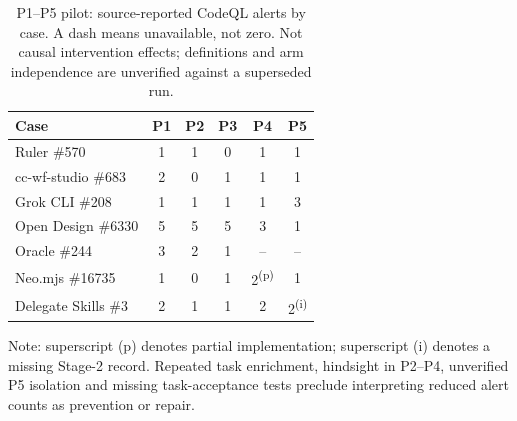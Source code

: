 \begin{table}[H]
\caption{P1--P5 pilot: source-reported CodeQL alerts by case. A dash means unavailable, not zero. Not causal intervention effects; definitions and arm independence are unverified against a superseded run.}
\label{tab:p1p5}
\small
\begin{tabular}{@{}lccccc@{}}
\toprule
\textbf{Case} & \textbf{P1} & \textbf{P2} & \textbf{P3} & \textbf{P4} & \textbf{P5}\\
\midrule
Ruler \#570 & 1&1&0&1&1\\
cc-wf-studio \#683 & 2&0&1&1&1\\
Grok CLI \#208 & 1&1&1&1&3\\
Open Design \#6330 & 5&5&5&3&1\\
Oracle \#244 & 3&2&1&--&--\\
Neo.mjs \#16735 & 1&0&1&2\textsuperscript{(p)}&1\\
Delegate Skills \#3 & 2&1&1&2&2\textsuperscript{(i)}\\
\bottomrule
\end{tabular}
\par\smallskip\raggedright\footnotesize Note: superscript (p) denotes partial implementation; superscript (i) denotes a missing Stage-2 record. Repeated task enrichment, hindsight in P2--P4, unverified P5 isolation and missing task-acceptance tests preclude interpreting reduced alert counts as prevention or repair.
\end{table}

{}

